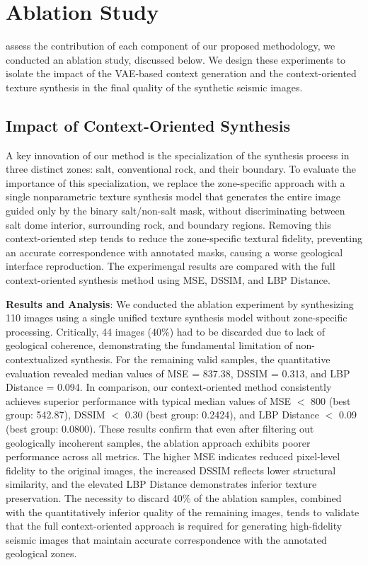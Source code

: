 \documentclass{ieeeaccess}
\begin{document}
\section{Ablation Study}
\label{sec:ablation}

 assess the contribution of each component of our proposed methodology, we conducted an ablation study, discussed below. We design these experiments to isolate the impact of the VAE-based context generation and the context-oriented texture synthesis in the final quality of the synthetic seismic images.

\subsection{Impact of Context-Oriented Synthesis}

A key innovation of our method is the specialization of the synthesis process in three distinct zones: salt, conventional rock, and their boundary. To evaluate the importance of this specialization, we replace the zone-specific approach with a single nonparametric texture synthesis model that generates the entire image guided only by the binary salt/non-salt mask, without discriminating between salt dome interior, surrounding rock, and boundary regions. Removing this context-oriented step tends to reduce the zone-specific textural fidelity, preventing an accurate correspondence with annotated masks, causing a worse geological interface reproduction. The experimengal results are compared with the full context-oriented synthesis method using MSE, DSSIM, and LBP Distance.

\textbf{Results and Analysis}: We conducted the ablation experiment by synthesizing 110 images using a single unified texture synthesis model without zone-specific processing. Critically, 44 images (40\%) had to be discarded due to lack of geological coherence, demonstrating the fundamental limitation of non-contextualized synthesis. For the remaining valid samples, the quantitative evaluation revealed median values of MSE = 837.38, DSSIM = 0.313, and LBP Distance = 0.094. In comparison, our context-oriented method consistently achieves superior performance with typical median values of MSE $<$ 800 (best group: 542.87), DSSIM $<$ 0.30 (best group: 0.2424), and LBP Distance $<$ 0.09 (best group: 0.0800). These results confirm that even after filtering out geologically incoherent samples, the ablation approach exhibits poorer performance across all metrics. The higher MSE indicates reduced pixel-level fidelity to the original images, the increased DSSIM reflects lower structural similarity, and the elevated LBP Distance demonstrates inferior texture preservation. The necessity to discard 40\% of the ablation samples, combined with the quantitatively inferior quality of the remaining images, tends to validate that the full context-oriented approach is required for generating high-fidelity seismic images that maintain accurate correspondence with the annotated geological zones.
\end{document}
